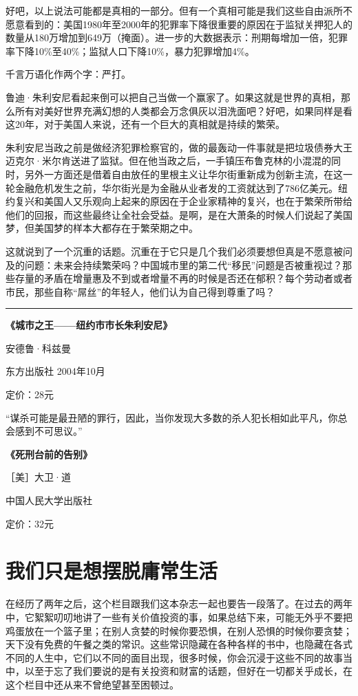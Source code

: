 好吧，以上说法可能都是真相的一部分。但有一个真相可能是我们这些自由派所不愿意看到的：美国1980年至2000年的犯罪率下降很重要的原因在于监狱关押犯人的数量从180万增加到649万（掩面）。进一步的大数据表示：刑期每增加一倍，犯罪率下降10\%至40\%；监狱人口下降10\%，暴力犯罪增加4\%。

千言万语化作两个字：严打。

鲁迪·朱利安尼看起来倒可以把自己当做一个赢家了。如果这就是世界的真相，那么所有对美好世界充满幻想的人类都会万念俱灰以泪洗面吧？好吧，如果同样是看这20年，对于美国人来说，还有一个巨大的真相就是持续的繁荣。

朱利安尼当政之前是做经济犯罪检察官的，做的最轰动一件事就是把垃圾债券大王迈克尔·米尔肯送进了监狱。但在他当政之后，一手镇压布鲁克林的小混混的同时，另外一方面还是借着自由放任的里根主义让华尔街重新成为创新主流，在这一轮金融危机发生之前，华尔街光是为金融从业者发的工资就达到了786亿美元。纽约复兴和美国人又乐观向上起来的原因在于企业家精神的复兴，也在于繁荣所带给他们的回报，而这些最终让全社会受益。是啊，是在大萧条的时候人们说起了美国梦，但美国梦的样本大都存在于繁荣期之中。

这就说到了一个沉重的话题。沉重在于它只是几个我们必须要想但真是不愿意被问及的问题：未来会持续繁荣吗？中国城市里的第二代``移民''问题是否被重视过？那些存量的矛盾在增量惠及不到或者增量不再的时候是否还在郁积？每个劳动者或者市民，那些自称``屌丝''的年轻人，他们认为自己得到尊重了吗？

\begin{center}\rule{3in}{0.4pt}\end{center}

\textbf{《城市之王------纽约市市长朱利安尼》}

安德鲁·科兹曼

东方出版社 2004年10月

定价：28元

``谋杀可能是最丑陋的罪行，因此，当你发现大多数的杀人犯长相如此平凡，你总会感到不可思议。''

\textbf{《死刑台前的告别》}

［美］大卫·道

中国人民大学出版社

定价：32元

\section{我们只是想摆脱庸常生活}

在经历了两年之后，这个栏目跟我们这本杂志一起也要告一段落了。在过去的两年中，它絮絮叨叨地讲了一些有关价值投资的事，如果总结下来，可能无外乎不要把鸡蛋放在一个篮子里；在别人贪婪的时候你要恐惧，在别人恐惧的时候你要贪婪；天下没有免费的午餐之类的常识。这些常识隐藏在各种各样的书中，也隐藏在各式不同的人生中，它们以不同的面目出现，很多时候，你会沉浸于这些不同的故事当中，以至于忘了我们要说的是有关投资和财富的话题，但好在一切都关乎成长，在这个栏目中还从来不曾绝望甚至困顿过。

